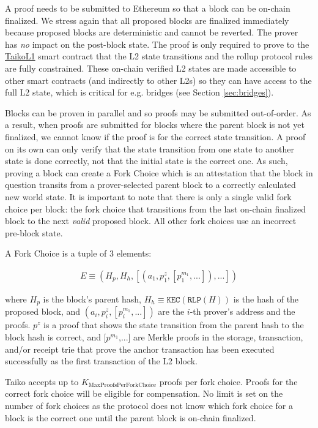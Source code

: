 \documentclass[9pt,oneside]{amsart}
\begin{document}
\begin{multicols}{2}
A proof needs to be submitted to Ethereum so that a block can be on-chain finalized. We stress again that all proposed blocks are finalized immediately because proposed blocks are deterministic and cannot be reverted. The prover has \emph{no} impact on the post-block state. The proof is only required to prove to the \underline{TaikoL1} smart contract that the L2 state transitions and the rollup protocol rules are fully constrained. These on-chain verified L2 states are made accessible to other smart contracts (and indirectly to other L2s) so they can have access to the full L2 state, which is critical for e.g. bridges (see Section \ref{sec:bridges}).

Blocks can be proven in parallel and so proofs may be submitted out-of-order. As a result, when proofs are submitted for blocks where the parent block is not yet finalized, we cannot know if the proof is for the correct state transition. A proof on its own can only verify that the state transition from one state to another state is done correctly, not that the initial state is the correct one. As such, proving a block can create a Fork Choice which is an attestation that the block in question transits from a prover-selected parent block to a correctly calculated new world state. It is important to note that there is only a single valid fork choice per block: the fork choice that transitions from the last on-chain finalized block to the next \emph{valid} proposed block. All other fork choices use an incorrect pre-block state.

A Fork Choice is a tuple of 3 elements:

\begin{eqnarray}
E \equiv (H_p, H_h, [(a_1, p^{z}_1, [p^{m_1}_1,...]),...])
\end{eqnarray}

where $H_p$ is the block's parent hash, $H_h \equiv \texttt{KEC}(\texttt{RLP}(H))$ is the hash of the proposed block, and $(a_i, p^{z}_i, [p^{m_1}_i,...])$ are the $i$-th prover's address and the proofs. $p^{z}$ is a proof that shows the state transition from the parent hash to the block hash is correct, and [$p^{m_1}$,...] are Merkle proofs in the storage, transaction, and/or receipt trie that prove the anchor transaction has been executed successfully as the first transaction of the L2 block.

Taiko accepts up to $K_{\mathrm{MaxProofsPerForkChoice}}$ proofs per fork choice. Proofs for the correct fork choice will be eligible for compensation. No limit is set on the number of fork choices as the protocol does not know which fork choice for a block is the correct one until the parent block is on-chain finalized.


\end{multicols}
\end{document}
